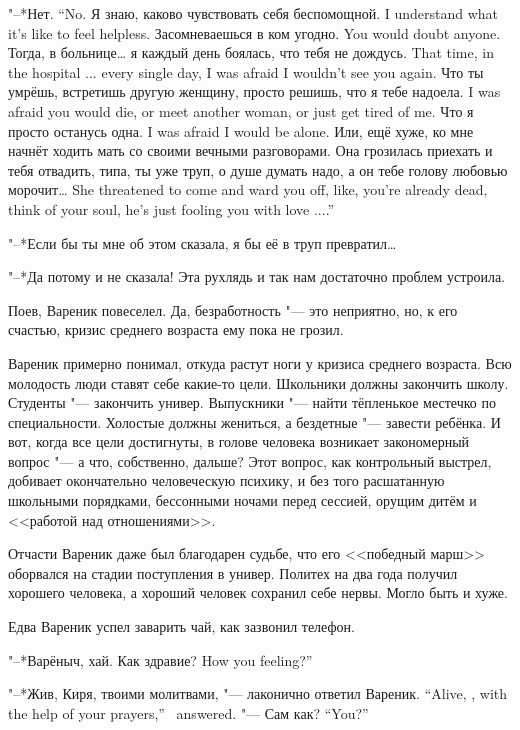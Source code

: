 {"--*Нет.}
{``No.}
{Я знаю, каково чувствовать себя беспомощной.}
{I understand what it's like to feel helpless.}
{Засомневаешься в ком угодно.}
{You would doubt anyone.}
{Тогда, в больнице\dots{} я каждый день боялась, что тебя не дождусь.}
{That time, in the hospital ... every single day, I was afraid I wouldn't see you again.}
{Что ты умрёшь, встретишь другую женщину, просто решишь, что я тебе надоела.}
{I was afraid you would die, or meet another woman, or just get tired of me.}
{Что я просто останусь одна.}
{I was afraid I would be alone.}
Или, ещё хуже, ко мне начнёт ходить мать со своими вечными разговорами.
{Она грозилась приехать и тебя отвадить, типа, ты уже труп, о душе думать надо, а он тебе голову любовью морочит\dots{}}
{She threatened to come and ward you off, like, you're already dead, think of your soul, he's just fooling you with love ....''}

"--*Если бы ты мне об этом сказала, я бы её в труп превратил\dots{}

"--*Да потому и не сказала!
Эта рухлядь и так нам достаточно проблем устроила.

Поев, Вареник повеселел.
Да, безработность "--- это неприятно, но, к его счастью, кризис среднего возраста ему пока не грозил.

Вареник примерно понимал, откуда растут ноги у кризиса среднего возраста.
Всю молодость люди ставят себе какие-то цели.
Школьники должны закончить школу.
Студенты "--- закончить универ.
Выпускники "--- найти тёпленькое местечко по специальности.
Холостые должны жениться, а бездетные "--- завести ребёнка.
И вот, когда все цели достигнуты, в голове человека возникает закономерный вопрос "--- а что, собственно, дальше?
Этот вопрос, как контрольный выстрел, добивает окончательно человеческую психику, и без того расшатанную школьными порядками, бессонными ночами перед сессией, орущим дитём и <<работой над отношениями>>.

Отчасти Вареник даже был благодарен судьбе, что его <<победный марш>> оборвался на стадии поступления в универ.
Политех на два года получил хорошего человека, а хороший человек сохранил себе нервы.
Могло быть и хуже.

\asterism

Едва Вареник успел заварить чай, как зазвонил телефон.

"--*Варёныч, хай.
{Как здравие?}
{How you feeling?''}

{"--*Жив, Киря, твоими молитвами, "--- лаконично ответил Вареник.}
{``Alive, \Kirya, with the help of your prayers,'' \Varenik\ answered.}
{"--- Сам как?}
{``You?''}

